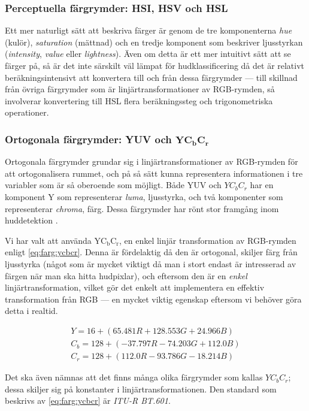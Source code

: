 \documentclass[../rapport_MVEX01-11-05]{subfiles}
\begin{document}
\subsubsection{Perceptuella färgrymder: HSI, HSV och HSL}

Ett mer naturligt sätt att beskriva färger är genom de tre
komponenterna \emph{hue} (kulör), \emph{saturation} (mättnad) och en
tredje komponent som beskriver ljusstyrkan (\emph{intensity},
\emph{value} eller \emph{lightness}). Även om detta är ett mer
intuitivt sätt att se färger på, så är det inte särskilt väl lämpat
för hudklassificering då det är relativt beräkningsintensivt att
konvertera till och från dessa färgrymder --- till skillnad från
övriga färgrymder som är linjärtransformationer av RGB-rymden, så
involverar konvertering till HSL flera beräkningssteg och
trigonometriska operationer.

\subsubsection[Ortogonala färgrymder: YUV och $\mathrm{YC_bC_r}$]{Ortogonala färgrymder: YUV och $\mathbf{YC_bC_r}$}

Ortogonala färgrymder grundar sig i linjärtransformationer av
RGB-rymden för att ortogonalisera rummet, och på så sätt kunna
representera informationen i tre variabler som är så oberoende som
möjligt. Både YUV och $YC_bC_r$ har en komponent Y som representerar
\emph{luma}, ljusstyrka, och två komponenter som representerar
\emph{chroma}, färg. Dessa färgrymder har rönt stor framgång inom
huddetektion \cite{Hsu02,Elmezain08,Hassanpour08}.

Vi har valt att använda $\mathrm{YC_bC_r}$, en enkel linjär transformation av
RGB-rymden enligt \eqref{eq:farg:ycbcr}. Denna är fördelaktig då den
är ortogonal, skiljer färg från ljusstyrka (något
som är mycket viktigt då man i stort endast är intresserad av färgen
när man ska hitta hudpixlar), och eftersom den är en \emph{enkel}
linjärtransformation, vilket gör det enkelt att implementera en
effektiv transformation från RGB --- en mycket viktig egenskap eftersom vi
behöver göra detta i realtid.

\begin{equation}
  \label{eq:farg:ycbcr}
  \begin{gathered}
  Y   = 16  + ( 65.481R + 128.553G + 24.966B)\\
  C_b = 128 + (-37.797R - 74.203G  + 112.0B )\\
  C_r = 128 + (112.0R   - 93.786G  - 18.214B)
  \end{gathered}
\end{equation}

Det ska även nämnas att det finns många olika färgrymder som kallas
$YC_bC_r$; dessa skiljer sig på konstanter i linjärtransformationen.
Den standard som beskrivs av \eqref{eq:farg:ycbcr} är \emph{ITU-R BT.601}.
\end{document}
